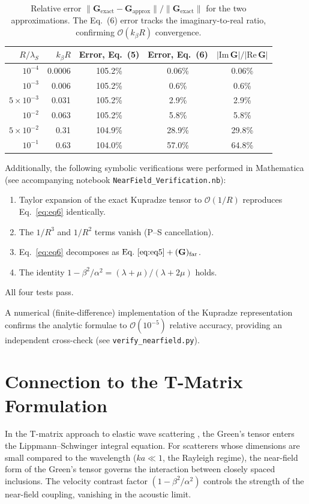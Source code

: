 \documentclass[11pt,a4paper]{article}
\newcommand{\bG}{\mathbf{G}}
\newcommand{\order}[1]{\mathcal{O}\!\left(#1\right)}
\begin{document}
\begin{table}[h!]
\centering
\caption{Relative error $\|\bG_\text{exact} - \bG_\text{approx}\|
  / \|\bG_\text{exact}\|$ for the two approximations.
  The Eq.~(6) error tracks the imaginary-to-real ratio,
  confirming $\order{k_\beta R}$ convergence.}
\label{tab:convergence}
\begin{tabular}{@{}rrccc@{}}
\toprule
$R/\lambda_S$ & $k_\beta R$ &
\multicolumn{1}{c}{Error, Eq.~(5)} &
\multicolumn{1}{c}{Error, Eq.~(6)} &
\multicolumn{1}{c}{$|\mathrm{Im}\,\bG|/|\mathrm{Re}\,\bG|$} \\
\midrule
$10^{-4}$ & 0.0006 & 105.2\% & 0.06\% & 0.06\% \\
$10^{-3}$ & 0.006  & 105.2\% & 0.6\%  & 0.6\%  \\
$5{\times}10^{-3}$ & 0.031 & 105.2\% & 2.9\% & 2.9\% \\
$10^{-2}$ & 0.063  & 105.2\% & 5.8\%  & 5.8\%  \\
$5{\times}10^{-2}$ & 0.31 & 104.9\% & 28.9\% & 29.8\% \\
$10^{-1}$ & 0.63   & 104.0\% & 57.0\% & 64.8\% \\
\bottomrule
\end{tabular}
\end{table}

\noindent
Additionally, the following symbolic verifications were performed
in Mathematica (see accompanying notebook
\texttt{NearField\_Verification.nb}):
\begin{enumerate}
  \item Taylor expansion of the exact Kupradze tensor to
        $\order{1/R}$ reproduces Eq.~\eqref{eq:eq6} identically.
  \item The $1/R^3$ and $1/R^2$ terms vanish (P--S cancellation).
  \item Eq.~\eqref{eq:eq6} decomposes as
        $\text{Eq.~\eqref{eq:eq5}} + (\bG)_\text{far}$.
  \item The identity
        $1 - \beta^2/\alpha^2 = (\lambda+\mu)/(\lambda+2\mu)$ holds.
\end{enumerate}
All four tests pass.

A numerical (finite-difference) implementation of the Kupradze
representation confirms the analytic formulae to $\order{10^{-5}}$
relative accuracy, providing an independent cross-check (see
\texttt{verify\_nearfield.py}).

\section{Connection to the T-Matrix Formulation}

In the T-matrix approach to elastic wave scattering
\citep{Nestor1996}, the Green's tensor enters the Lippmann--Schwinger
integral equation. For scatterers whose dimensions are small compared
to the wavelength ($ka \ll 1$, the Rayleigh regime), the
near-field form of the Green's tensor governs the
interaction between closely spaced inclusions. The
velocity contrast factor $(1 - \beta^2/\alpha^2)$ controls the
strength of the near-field coupling, vanishing in the acoustic limit.

\bigskip


\end{document}
